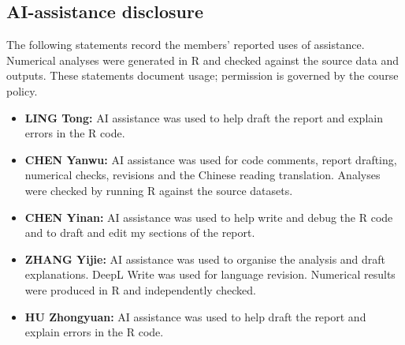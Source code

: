 \subsection*{AI-assistance disclosure}
The following statements record the members' reported uses of assistance. Numerical analyses were generated in R and checked against the source data and outputs. These statements document usage; permission is governed by the course policy.
\begin{itemize}\setlength\itemsep{3pt}
\item \textbf{LING Tong:} AI assistance was used to help draft the report and explain errors in the R code.
\item \textbf{CHEN Yanwu:} AI assistance was used for code comments, report drafting, numerical checks, revisions and the Chinese reading translation. Analyses were checked by running R against the source datasets.
\item \textbf{CHEN Yinan:} AI assistance was used to help write and debug the R code and to draft and edit my sections of the report.
\item \textbf{ZHANG Yijie:} AI assistance was used to organise the analysis and draft explanations. DeepL Write was used for language revision. Numerical results were produced in R and independently checked.
\item \textbf{HU Zhongyuan:} AI assistance was used to help draft the report and explain errors in the R code.
\end{itemize}
